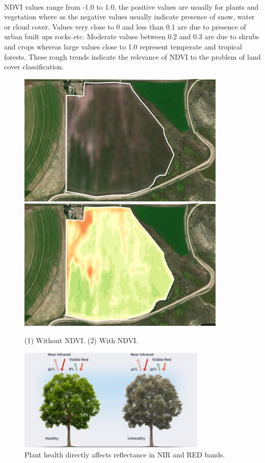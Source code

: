 \documentclass[12pt, a4paper]{report}
\begin{document}
\paragraph{}
NDVI values range from -1.0 to 1.0, the positive values are usually for plants and vegetation where as the negative values usually indicate presence of snow, water or cloud cover. Values very close to 0 and less than 0.1 are due to presence of urban built ups rocks etc. Moderate values between 0.2 and 0.3 are due to shrubs and crops whereas large values close to 1.0 represent temperate and tropical forests. These rough trends indicate the relevance of NDVI to the problem of land cover classification.
\begin{figure}[ht!]
\includegraphics[width=.45\textwidth]{ndvisampleone.jpg}\hfill
\includegraphics[width=.45\textwidth]{ndvisampletwo.jpg}
\caption{(1) Without NDVI. (2) With NDVI.}
\end{figure}
\begin{figure}[h]
\centering
\includegraphics[width=0.8\textwidth]{ndviillustration.jpg}
\caption{Plant health directly affects reflectance in NIR and RED bands.}
\end{figure}
\end{document}
